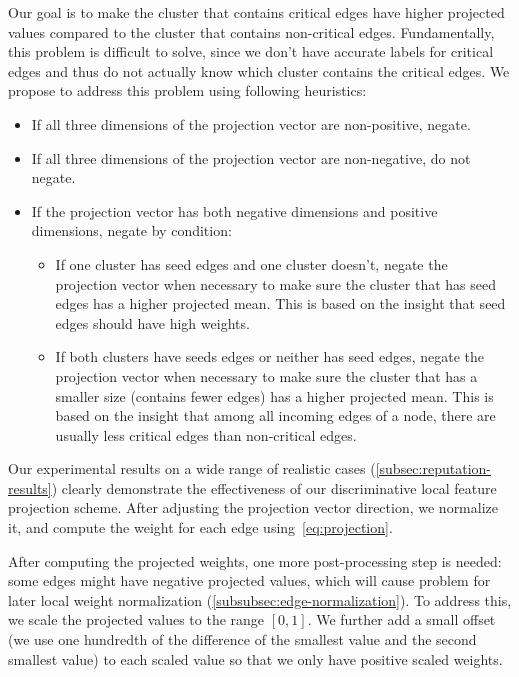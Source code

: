 Our goal is to make the cluster that contains critical edges have higher projected values compared to the cluster that contains non-critical edges. 
Fundamentally, this problem is difficult to solve, since we don't have accurate labels for critical edges and thus do not actually know which cluster contains the critical edges.
%
We propose to address this problem using following heuristics:
\begin{itemize}[noitemsep, topsep=1pt, partopsep=1pt, listparindent=\parindent, leftmargin=*]

\item If all three dimensions of the projection vector are non-positive, negate.
\item If all three dimensions of the projection vector are non-negative, do not negate.
\item If the projection vector has both negative dimensions and positive dimensions, negate by condition:

\begin{itemize}[noitemsep, topsep=1pt, partopsep=1pt, listparindent=\parindent, leftmargin=*]
    \item If one cluster has seed edges and one cluster doesn't, negate the projection vector when necessary to make sure the cluster that has seed edges has a higher projected mean. This is based on the insight that seed edges should have high weights.
    \item If both clusters have seeds edges or neither has seed edges, negate the projection vector when necessary to make sure the cluster that has a smaller size (\ie contains fewer edges) has a higher projected mean. This is based on the insight that among all incoming edges of a node, there are usually less critical edges than non-critical edges.
\end{itemize}
\end{itemize}

Our experimental results on a wide range of realistic cases (\cref{subsec:reputation-results}) clearly demonstrate the effectiveness of our discriminative local feature projection scheme.
After adjusting the projection vector direction, we normalize it, and compute the weight for each edge using~\cref{eq:projection}. 

After computing the projected weights, one more post-processing step is needed: some edges might have negative projected values, which will cause problem for later local weight normalization (\cref{subsubsec:edge-normalization}). 
To address this, we scale the projected values to the range $[0, 1]$. We further add a small offset (we use one hundredth of the difference of the smallest value and the second smallest value) to each scaled value so that we only have positive scaled weights.



